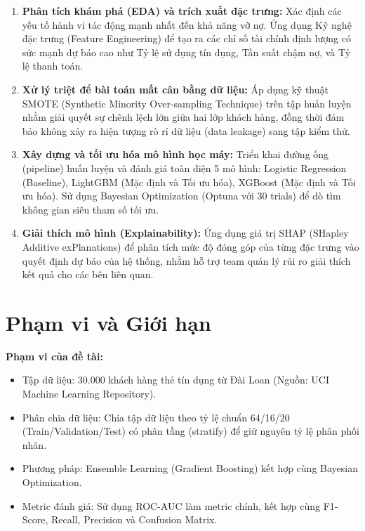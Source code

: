 \begin{enumerate}

    \item \textbf{Phân tích khám phá (EDA) và trích xuất đặc trưng:} Xác định các yếu tố hành vi tác động mạnh nhất đến khả năng vỡ nợ. Ứng dụng Kỹ nghệ đặc trưng (Feature Engineering) để tạo ra các chỉ số tài chính định lượng có sức mạnh dự báo cao như Tỷ lệ sử dụng tín dụng, Tần suất chậm nợ, và Tỷ lệ thanh toán.

    \item \textbf{Xử lý triệt để bài toán mất cân bằng dữ liệu:} Áp dụng kỹ thuật SMOTE (Synthetic Minority Over-sampling Technique) trên tập huấn luyện nhằm giải quyết sự chênh lệch lớn giữa hai lớp khách hàng, đồng thời đảm bảo không xảy ra hiện tượng rò rỉ dữ liệu (data leakage) sang tập kiểm thử.

    \item \textbf{Xây dựng và tối ưu hóa mô hình học máy:} Triển khai đường ống (pipeline) huấn luyện và đánh giá toàn diện 5 mô hình: Logistic Regression (Baseline), LightGBM (Mặc định và Tối ưu hóa), XGBoost (Mặc định và Tối ưu hóa). Sử dụng Bayesian Optimization (Optuna với 30 trials) để dò tìm không gian siêu tham số tối ưu.

    \item \textbf{Giải thích mô hình (Explainability):} Ứng dụng giá trị SHAP (SHapley Additive exPlanations) để phân tích mức độ đóng góp của từng đặc trưng vào quyết định dự báo của hệ thống, nhằm hỗ trợ team quản lý rủi ro giải thích kết quả cho các bên liên quan.

\end{enumerate}

\section{Phạm vi và Giới hạn}

\textbf{Phạm vi của đề tài:}
\begin{itemize}
    \item Tập dữ liệu: 30.000 khách hàng thẻ tín dụng từ Đài Loan (Nguồn: UCI Machine Learning Repository).
    \item Phân chia dữ liệu: Chia tập dữ liệu theo tỷ lệ chuẩn 64/16/20 (Train/Validation/Test) có phân tầng (stratify) để giữ nguyên tỷ lệ phân phối nhãn.
    \item Phương pháp: Ensemble Learning (Gradient Boosting) kết hợp cùng Bayesian Optimization.
    \item Metric đánh giá: Sử dụng ROC-AUC làm metric chính, kết hợp cùng F1-Score, Recall, Precision và Confusion Matrix.
\end{itemize}

